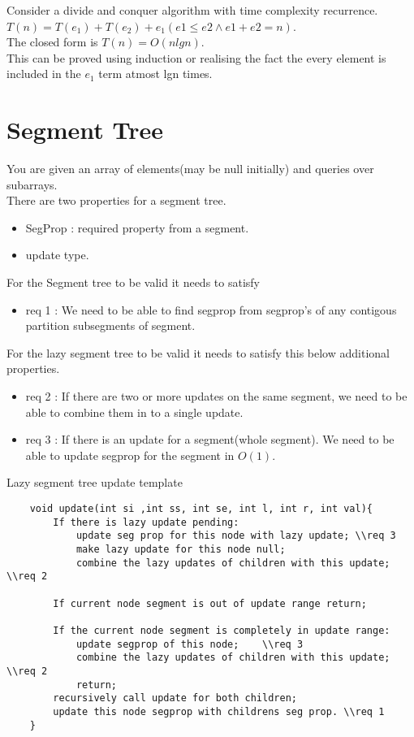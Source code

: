 \documentclass[../Notes.tex]{subfiles}
\begin{document}
Consider a divide and conquer algorithm with time complexity recurrence.
$T(n)=T(e_1)+T(e_2)+e_1 (e1\leq e2 \wedge e1+e2=n)$.\\ 
The closed form is $T(n) = O(nlgn)$.\\
This can be proved using induction or realising the fact the every element is included in the $e_1$ term atmost lgn times.\\

\section{Segment Tree}
You are given an array of elements(may be null initially) and queries over subarrays.\\
There are two properties for a segment tree.
\begin{itemize}
	\item SegProp : required property from a segment.
	\item update type.
\end{itemize}

For the Segment tree to be valid it needs to satisfy
\begin{itemize}
	\item req 1 : We need to be able to find segprop from segprop's of any contigous partition subsegments of segment. 
\end{itemize}

For the lazy segment tree to be valid it needs to satisfy this below additional properties.
\begin{itemize}
	\item req 2 : If there are two or more updates on the same segment, we need to be able to combine them in to a single update.
	\item req 3 : If there is an update for a segment(whole segment). We need to be able to update segprop for the segment in $O(1)$.
\end{itemize}
Lazy segment tree update template
\begin{lstlisting}
	void update(int si ,int ss, int se, int l, int r, int val){
		If there is lazy update pending:
			update seg prop for this node with lazy update;	\\req 3
			make lazy update for this node null;
			combine the lazy updates of children with this update;	\\req 2
		
		If current node segment is out of update range return;
		
		If the current node segment is completely in update range:
			update segprop of this node;	\\req 3
			combine the lazy updates of children with this update; \\req 2
			return;
		recursively call update for both children;
		update this node segprop with childrens seg prop. \\req 1
	}
\end{lstlisting}
\end{document}
